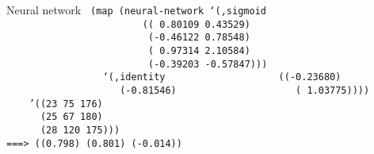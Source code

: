 \documentclass{beamer}
\begin{document}
\begin{frame}{Neural network}
  \texttt{
    (map (neural-network `(,sigmoid \\
    \ \ \ \ \ \ \ \ \ \ \ \ \ \ \ \ \ \ \ \ \ \ \ \ (( 0.80109  0.43529) \\
    \ \ \ \ \ \ \ \ \ \ \ \ \ \ \ \ \ \ \ \ \ \ \ \ \ (-0.46122  0.78548)\\
    \ \ \ \ \ \ \ \ \ \ \ \ \ \ \ \ \ \ \ \ \ \ \ \ \ ( 0.97314  2.10584)\\
    \ \ \ \ \ \ \ \ \ \ \ \ \ \ \ \ \ \ \ \ \ \ \ \ \ (-0.39203 -0.57847)))\\
    \ \ \ \ \ \ \ \ \ \ \ \ \ \ \ \ \ `(,identity \\
    \ \ \ \ \ \ \ \ \ \ \ \ \ \ \ \ \ \ \ ((-0.23680)\\
    \ \ \ \ \ \ \ \ \ \ \ \ \ \ \ \ \ \ \ \ (-0.81546)\\
    \ \ \ \ \ \ \ \ \ \ \ \ \ \ \ \ \ \ \ \ ( 1.03775))))\\
    \ \ \ \ '((23  75 176) \\
    \ \ \ \ \ \ (25  67 180) \\
    \ \ \ \ \ \ (28 120 175))) \\ \pause
    ===> ((0.798) (0.801) (-0.014))
  }
\end{frame}



\end{document}
